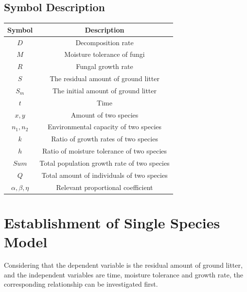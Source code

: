 \documentclass{mcmthesis}
\begin{document}
\subsection{Symbol Description}
\begin{table}[H]
	\centering
	\begin{tabular}{cc}
		\toprule[1.5pt]
		Symbol & Description \\
		\midrule
		$D$ & Decomposition rate \\
		$M$ & Moisture tolerance of fungi\\
		$R$ & Fungal growth rate\\
		$S$ & The residual amount of ground litter \\
		$S_m$ &  The initial amount of ground litter\\
		$t$ &  Time\\
		$x,y$ &  Amount of two species\\
		$n_1,n_2$ &  Environmental capacity of two species\\
		$k$ &  Ratio of growth rates of two species\\
		$h$ &  Ratio of moisture tolerance of two species\\
		$Sum$ &  Total population growth rate of two species\\
		$Q$ &  Total amount of individuals of two species\\
		$\alpha,\beta,\eta$ &  Relevant proportional coefficient\\
		
		\bottomrule[1.5pt]
	\end{tabular}%
\end{table}%
\section{Establishment of Single Species Model}
Considering that the dependent variable is the residual amount of ground litter, and the independent variables are time, moisture tolerance and growth rate, the corresponding relationship can be investigated first.
\end{document}
